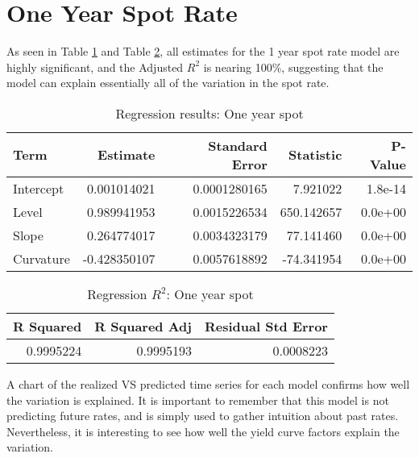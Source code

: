 \documentclass[openany]{book}
\theoremstyle{definition}
\theoremstyle{definition}
\theoremstyle{definition}
\theoremstyle{remark}
\begin{document}
\normalsize

\hypertarget{one-year-spot-rate}{%
\section{One Year Spot Rate}\label{one-year-spot-rate}}

As seen in Table \ref{tab:one-year-reg} and Table
\ref{tab:one-year-reg-r2}, all estimates for the 1 year spot rate model
are highly significant, and the Adjusted \(R^2\) is nearing 100\%,
suggesting that the model can explain essentially all of the variation
in the spot rate.

\small

\begin{table}[H]

\caption{\label{tab:one-year-reg}Regression results: One year spot}
\centering
\begin{tabular}[t]{lrrrr}
\toprule
Term & Estimate & Standard Error & Statistic & P-Value\\
\midrule
Intercept & 0.001014021 & 0.0001280165 & 7.921022 & 1.8e-14\\
Level & 0.989941953 & 0.0015226534 & 650.142657 & 0.0e+00\\
Slope & 0.264774017 & 0.0034323179 & 77.141460 & 0.0e+00\\
Curvature & -0.428350107 & 0.0057618892 & -74.341954 & 0.0e+00\\
\bottomrule
\end{tabular}
\end{table}

\normalsize

\small

\begin{table}[H]

\caption{\label{tab:one-year-reg-r2}Regression $R^2$: One year spot}
\centering
\begin{tabular}[t]{rrr}
\toprule
R Squared & R Squared Adj & Residual Std Error\\
\midrule
0.9995224 & 0.9995193 & 0.0008223\\
\bottomrule
\end{tabular}
\end{table}

\normalsize

A chart of the realized VS predicted time series for each model confirms
how well the variation is explained. It is important to remember that
this model is not predicting future rates, and is simply used to gather
intuition about past rates. Nevertheless, it is interesting to see how
well the yield curve factors explain the variation.
\end{document}
